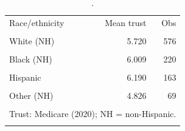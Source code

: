 \begin{table}[htbp]\centering
\caption{.}
\label{tab:trust_mean_by_race_eth_medicare_2020}
\begin{tabular}{lrr}\toprule
Race/ethnicity & Mean trust & Obs \\\\ \midrule
White (NH) & 5.720 & 576 \\\\
Black (NH) & 6.009 & 220 \\\\
Hispanic & 6.190 & 163 \\\\
Other (NH) & 4.826 & 69 \\\\
\bottomrule
\multicolumn{3}{l}{\footnotesize Trust: Medicare (2020); NH = non-Hispanic.} \\\\
\end{tabular}
\end{table}
